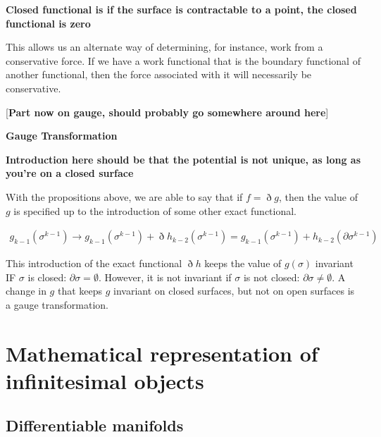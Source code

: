 \documentclass{book}
\begin{document}
\textbf{Closed functional is if the surface is contractable to a point, the closed functional is zero}


This allows us an alternate way of determining, for instance, work from a conservative force. If we have a work functional that is the boundary functional of another functional, then the force associated with it will necessarily be conservative.

[\textbf{Part now on gauge, should probably go somewhere around here}]


\textbf{Gauge Transformation}

\textbf{Introduction here should be that the potential is not unique, as long as you're on a closed surface}

With the propositions above, we are able to say that if $f = \eth g$, then the value of $g$ is specified up to the introduction of some other exact functional. 

\begin{gather} 
g_{k-1}(\sigma^{k-1}) \to g_{k-1}(\sigma^{k-1}) + \eth h_{k-2}(\sigma^{k-1}) = g_{k-1}(\sigma^{k-1}) + h_{k-2}(\partial\sigma^{k-1})
\end{gather}



This introduction of the exact functional $\eth h$ keeps the value of $g(\sigma)$ invariant IF $\sigma$ is closed: $\partial\sigma = \emptyset$. However, it is not invariant if $\sigma$ is not closed: $\partial\sigma \neq \emptyset$. A change in $g$ that keeps $g$ invariant on closed surfaces, but not on open surfaces is a gauge transformation. 



\chapter{Mathematical representation of infinitesimal objects}



\section{Differentiable manifolds}
\end{document}
